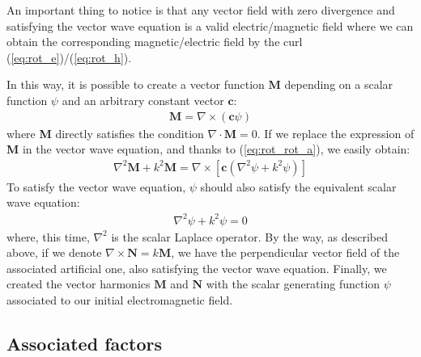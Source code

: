 \documentclass{article}
\numberwithin{equation}{section}
\begin{document}
An important thing to notice is that any vector field with zero divergence and satisfying the vector wave equation is a valid electric/magnetic field where we can obtain the corresponding magnetic/electric field by the curl (\ref{eq:rot_e})/(\ref{eq:rot_h}).

In this way, it is possible to create a vector function $\textbf{M}$ depending on a scalar function $\psi$ and an arbitrary constant vector $\textbf{c}$:
\begin{align}
\textbf{M} = \nabla \times (\textbf{c}\psi)
\end{align}
where \textbf{M} directly satisfies the condition $\nabla \cdot \textbf{M} = 0$. If we replace the expression of \textbf{M} in the vector wave equation, and thanks to (\ref{eq:rot_rot_a}), we easily obtain:
\begin{align}
\nabla ^{2} \textbf{M} + k^{2}\textbf{M} = \nabla \times [\textbf{c}(\nabla ^{2} \psi + k^{2}\psi)]
\end{align}
To satisfy the vector wave equation, $\psi$ should also satisfy the equivalent scalar wave equation:
\begin{align}\label{eq:psi_wave_eq}
\nabla ^{2} \psi + k^{2}\psi = 0
\end{align}
where, this time, $\nabla ^{2}$ is the scalar Laplace operator. By the way, as described above, if we denote $\nabla \times \textbf{N} = k \textbf{M}$, we have the perpendicular vector field of the associated artificial one, also satisfying the vector wave equation. Finally, we created the vector harmonics $\textbf{M}$ and $\textbf{N}$ with the scalar generating function $\psi$ associated to our initial electromagnetic field.

\subsection{Associated factors}
\end{document}
